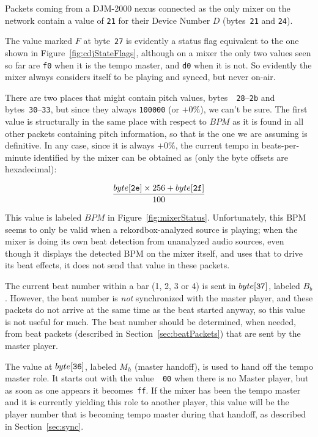 \documentclass[11pt]{article}
\begin{document}
Packets coming from a DJM-2000 nexus connected as the only mixer on
the network contain a value of {\tt 21} for their Device Number $D$
(bytes~{\tt 21} and {\tt 24}).

The value marked $F$ at byte~{\tt 27} is evidently a status flag
equivalent to the one shown in Figure~\ref{fig:cdjStateFlags},
although on a mixer the only two values seen so far are {\tt f0} when
it is the tempo master, and {\tt d0} when it is not. So evidently the
mixer always considers itself to be playing and synced, but never
on-air.

There are two places that might contain pitch values, bytes~{\tt
  28}--{\tt 2b} and bytes~{\tt 30}--{\tt 33}, but since they always
{\tt 100000} (or $+0\%$), we can't be sure. The first value is
structurally in the same place with respect to $BPM$ as it is found in
all other packets containing pitch information, so that is the one we
are assuming is definitive. In any case, since it is always $+0\%$,
the current tempo in beats-per-minute identified by the mixer can be
obtained as (only the byte offsets are hexadecimal):

\[ \frac{byte[{\tt 2e}] \times 256 + byte[{\tt 2f}]}{100} \]

This value is labeled $BPM$ in Figure~\ref{fig:mixerStatus}.
Unfortunately, this BPM seems to only be valid when a
rekordbox-analyzed source is playing; when the mixer is doing its own
beat detection from unanalyzed audio sources, even though it displays
the detected BPM on the mixer itself, and uses that to drive its beat
effects, it does not send that value in these packets.

The current beat number within a bar (1, 2, 3 or 4) is sent in
$byte[{\tt 37}]$, labeled $B_b$. However, the beat number is
\emph{not} synchronized with the master player, and these packets do
not arrive at the same time as the beat started anyway, so this value
is not useful for much. The beat number should be determined, when
needed, from beat packets (described in Section~\ref{sec:beatPackets})
that are sent by the master player.

The value at $byte[{\tt 36}]$, labeled $M_h$ (master handoff), is used
to hand off the tempo master role. It starts out with the value~{\tt
  00} when there is no Master player, but as soon as one appears it
becomes~{\tt ff}. If the mixer has been the tempo master and it is
currently yielding this role to another player, this value will be the
player number that is becoming tempo master during that handoff, as
described in Section~\ref{sec:sync}.
\end{document}
